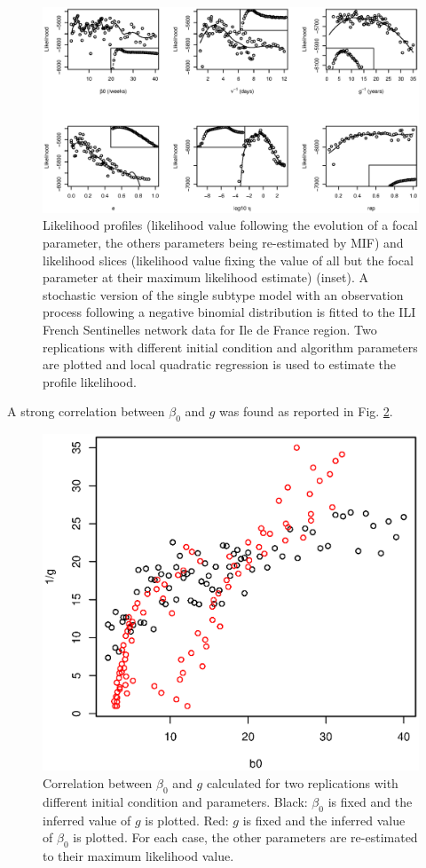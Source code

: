 \begin{figure}[htb]
  \center
    \includegraphics[width= 0.9 \linewidth]{texte/article2/graph_annexe/profile.eps}
    \caption{Likelihood profiles (likelihood value following the
      evolution of a focal parameter, the others parameters being
      re-estimated by MIF) and likelihood slices (likelihood value
      fixing the value of all but the focal parameter at their maximum
      likelihood estimate) (inset). A stochastic version of the single
      subtype model with an observation process following a negative
      binomial distribution is fitted to the ILI French Sentinelles
      network data for Ile de France region. Two replications with
      different initial condition and algorithm parameters are plotted
      and local quadratic regression is used to estimate the profile
      likelihood.}
  \label{fig:profile}
\end{figure}

A strong correlation between $\beta_0$ and $g$ was found as reported in Fig.
\ref{fig:cor}.


\begin{figure}[htb]
  \center
    \includegraphics[width= 0.5 \linewidth]{texte/article2/graph_annexe/corr_g_b0.eps}
    \caption{Correlation between $\beta_0$ and $g$ calculated for two
      replications with different initial condition and 
      parameters. Black: $\beta_0$ is fixed and the inferred value of
      $g$ is plotted. Red: $g$ is fixed and the inferred value of
      $\beta_0$ is plotted. For each case, the other parameters are
      re-estimated to their maximum likelihood value. }
  \label{fig:cor}
\end{figure}

